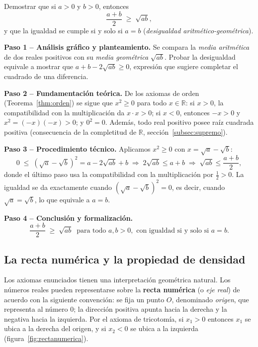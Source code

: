 \begin{example} Demostrar que si $a > 0$ y $b > 0$, entonces
\[
   \frac{a+b}{2} \;\geq\; \sqrt{ab},
\]
y que la igualdad se cumple si y solo si $a = b$
(\emph{desigualdad aritmético-geométrica}).

\begin{myproof}
\textbf{Paso 1 – Análisis gráfico y planteamiento.}
Se compara la \emph{media aritmética} de dos reales positivos con su
\emph{media geométrica} $\sqrt{ab}$. Probar la desigualdad equivale a
mostrar que $a + b - 2\sqrt{ab} \geq 0$, expresión que sugiere completar el
cuadrado de una diferencia.

\textbf{Paso 2 – Fundamentación teórica.}
De los axiomas de orden (Teorema~\ref{thm:orden}) se sigue que
$x^2 \geq 0$ para todo $x \in \mathbb{R}$: si $x > 0$, la compatibilidad
con la multiplicación da $x \cdot x > 0$; si $x < 0$, entonces $-x > 0$ y
$x^2 = (-x)(-x) > 0$; y $0^2 = 0$. Además, todo real positivo posee raíz
cuadrada positiva (consecuencia de la completitud de $\mathbb{R}$,
sección~\ref{subsec:supremo}).

\textbf{Paso 3 – Procedimiento técnico.}
Aplicamos $x^2 \geq 0$ con $x = \sqrt{a} - \sqrt{b}$:
\[
   0 \;\leq\; \left(\sqrt{a}-\sqrt{b}\right)^2 = a - 2\sqrt{ab} + b
   \;\Rightarrow\; 2\sqrt{ab} \leq a + b
   \;\Rightarrow\; \sqrt{ab} \leq \frac{a+b}{2},
\]
donde el último paso usa la compatibilidad con la multiplicación por
$\tfrac{1}{2} > 0$. La igualdad se da exactamente cuando
$\left(\sqrt{a}-\sqrt{b}\right)^2 = 0$, es decir, cuando
$\sqrt{a} = \sqrt{b}$, lo que equivale a $a = b$.

\textbf{Paso 4 – Conclusión y formalización.}
\[
   \boxed{\frac{a+b}{2} \;\geq\; \sqrt{ab} \;\; \text{para todo } a, b > 0,
   \text{ con igualdad si y solo si } a = b.}
\]
\end{myproof}
\end{example}

\subsection{La recta numérica y la propiedad de densidad}

Los axiomas enunciados tienen una interpretación geométrica natural. Los
números reales pueden representarse sobre la \textbf{recta numérica}
(o \textit{eje real}) de acuerdo con la siguiente convención: se fija un punto
$O$, denominado \textit{origen}, que representa al número $0$; la dirección
positiva apunta hacia la derecha y la negativa hacia la izquierda. Por el
axioma de tricotomía, si $x_1 > 0$ entonces $x_1$ se ubica a la derecha del
origen, y si $x_2 < 0$ se ubica a la izquierda
(figura~\ref{fig:rectanumerica}).

